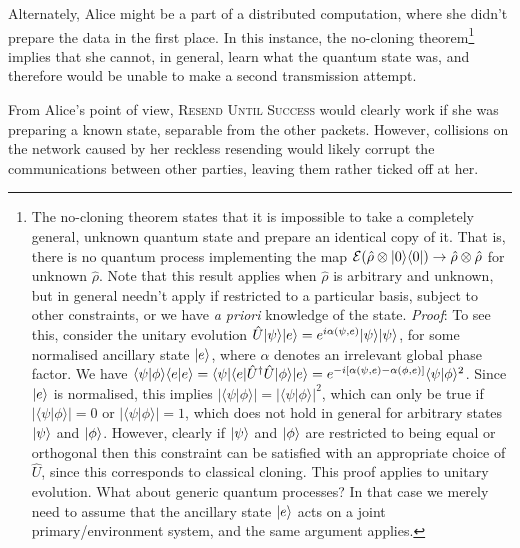 Alternately, Alice might be a part of a distributed computation, where she didn't prepare the data in the first place. In this instance, the no-cloning theorem\footnote{The no-cloning theorem states that it is impossible to take a completely general, unknown quantum state and prepare an identical copy of it. That is, there is no quantum process implementing the map \mbox{$\mathcal{E}(\hat\rho\otimes|0\rangle\langle0|) \to \hat\rho\otimes\hat\rho$} for unknown $\hat\rho$. Note that this result applies when $\hat\rho$ is arbitrary and unknown, but in general needn't apply if restricted to a particular basis, subject to other constraints, or we have \textit{a priori} knowledge of the state. \textit{Proof}: To see this, consider the unitary evolution \mbox{$\hat{U}|\psi\rangle|e\rangle = e^{i\alpha(\psi,e)}|\psi\rangle|\psi\rangle$}, for some normalised ancillary state $|e\rangle$, where $\alpha$ denotes an irrelevant global phase factor. We have \mbox{$\langle\psi|\phi\rangle\langle e|e\rangle = \langle\psi|\langle e|\hat{U}^\dag\hat{U}|\phi\rangle|e\rangle = e^{-i[\alpha(\psi,e)-\alpha(\phi,e)]} \langle\psi|\phi\rangle^2$}. Since $|e\rangle$ is normalised, this implies \mbox{$|\langle\psi|\phi\rangle| = |\langle\psi|\phi\rangle|^2$}, which can only be true if \mbox{$ |\langle\psi|\phi\rangle|=0$} or \mbox{$ |\langle\psi|\phi\rangle|=1$}, which does not hold in general for arbitrary states $|\psi\rangle$ and $|\phi\rangle$. However, clearly if $|\psi\rangle$ and $|\phi\rangle$ are restricted to being equal or orthogonal then this constraint can be satisfied with an appropriate choice of $\hat{U}$, since this corresponds to classical cloning. This proof applies to unitary evolution. What about generic quantum processes? In that case we merely need to assume that the ancillary state $|e\rangle$ acts on a joint primary/environment system, and the same argument applies.} implies that she cannot, in general, learn what the quantum state was, and therefore would be unable to make a second transmission attempt.

From Alice's point of view, \textsc{Resend Until Success} would clearly work if she was preparing a known state, separable from the other packets. However, collisions on the network caused by her reckless resending would likely corrupt the communications between other parties, leaving them rather ticked off at her.

